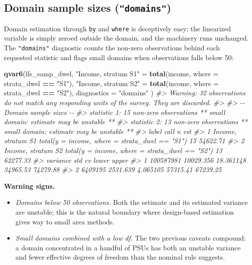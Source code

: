 \documentclass[
]{article}
\newenvironment{Shaded}{\begin{snugshade}}{\end{snugshade}}
\newcommand{\AttributeTok}[1]{\textcolor[rgb]{0.13,0.29,0.53}{#1}}
\newcommand{\CommentTok}[1]{\textcolor[rgb]{0.56,0.35,0.01}{\textit{#1}}}
\newcommand{\FunctionTok}[1]{\textcolor[rgb]{0.13,0.29,0.53}{\textbf{#1}}}
\newcommand{\NormalTok}[1]{#1}
\newcommand{\OtherTok}[1]{\textcolor[rgb]{0.56,0.35,0.01}{#1}}
\newcommand{\SpecialCharTok}[1]{\textcolor[rgb]{0.81,0.36,0.00}{\textbf{#1}}}
\newcommand{\StringTok}[1]{\textcolor[rgb]{0.31,0.60,0.02}{#1}}
\providecommand{\tightlist}{%
  \setlength{\itemsep}{0pt}\setlength{\parskip}{0pt}}
\begin{document}
\subsection{\texorpdfstring{Domain sample sizes
(\texttt{"domains"})}{Domain sample sizes ("domains")}}\label{domain-sample-sizes-domains}

Domain estimation through \texttt{by} and \texttt{where} is deceptively
easy: the linearized variable is simply zeroed outside the domain, and
the machinery runs unchanged. The \texttt{"domains"} diagnostic counts
the non-zero observations behind each requested statistic and flags
small domains when observations falls below 50:

\begin{Shaded}
\begin{Highlighting}[]
\FunctionTok{qvar6}\NormalTok{(lfs\_samp\_dwel,}
  \StringTok{"Income, stratum S1"} \OtherTok{=} \FunctionTok{total}\NormalTok{(income, }\AttributeTok{where =}\NormalTok{ strata\_dwel }\SpecialCharTok{==} \StringTok{"S1"}\NormalTok{),}
  \StringTok{"Income, stratum S2"} \OtherTok{=} \FunctionTok{total}\NormalTok{(income, }\AttributeTok{where =}\NormalTok{ strata\_dwel }\SpecialCharTok{==} \StringTok{"S2"}\NormalTok{),}
  \AttributeTok{diagnostics =} \StringTok{"domains"}
\NormalTok{)}
\CommentTok{\#\textgreater{} Warning: 32 observations do not match any responding units of the survey. They are discarded.}
\CommentTok{\#\textgreater{} }
\CommentTok{\#\textgreater{} {-}{-} Domain sample sizes {-}{-}}
\CommentTok{\#\textgreater{}   statistic 1: 15 non{-}zero observations  ** small domain: estimate may be unstable **}
\CommentTok{\#\textgreater{}   statistic 2: 13 non{-}zero observations  ** small domain: estimate may be unstable **}
\CommentTok{\#\textgreater{}                label                                           call  n      est}
\CommentTok{\#\textgreater{} 1 Income, stratum S1 total(y = income, where = strata\_dwel == "S1") 15 54622.71}
\CommentTok{\#\textgreater{} 2 Income, stratum S2 total(y = income, where = strata\_dwel == "S2") 13 62277.33}
\CommentTok{\#\textgreater{}    variance       std        cv    lower    upper}
\CommentTok{\#\textgreater{} 1 100587981 10029.356 18.361148 34965.53 74279.88}
\CommentTok{\#\textgreater{} 2   6409195  2531.639  4.065105 57315.41 67239.25}
\end{Highlighting}
\end{Shaded}

\textbf{Warning signs.}

\begin{itemize}
\tightlist
\item
  \emph{Domains below 50 observations.} Both the estimate and its
  estimated variance are unstable; this is the natural boundary where
  design-based estimation gives way to small area methods.
\item
  \emph{Small domains combined with a low df.} The two previous caveats
  compound: a domain concentrated in a handful of PSUs has both an
  unstable variance and fewer effective degrees of freedom than the
  nominal rule suggests.
\end{itemize}
\end{document}
